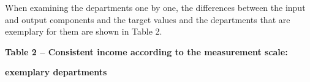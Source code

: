 When examining the departments one by one, the differences between the
input and output components and the target values
\hspace{0pt}\hspace{0pt}and the departments that are exemplary for them
are shown in Table 2.

{\bfseries Table 2 -- Consistent income according to the measurement
scale:}

{\bfseries exemplary departments}

